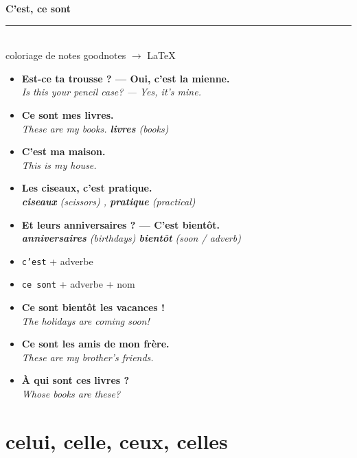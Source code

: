 \documentclass[11pt,a4paper]{article}
\newcommand{\pair}[2]{%
  \item \textbf{#1}\\
  {\color{noteblue}\textit{#2}}%
}
\newcommand{\vocab}[2]{%
  \textbf{#1} {\color{noteblue}\textit{(#2)}}%
}
\begin{document}

\begin{center}
  {\color{plum}\LARGE\bfseries C'est, ce sont}\\[4pt]
  {\color{lavender}\rule{0.55\textwidth}{2.5pt}}\\[6pt]
  {\small coloriage de notes \textbullet{} goodnotes $\rightarrow$ \LaTeX}
\end{center}

\vspace{0.6em}

\begin{exbox}
\begin{itemize}[leftmargin=1.2em,itemsep=0.55em]
  \pair{Est-ce ta trousse ? --- Oui, c'est la mienne.}
       {Is this your pencil case? --- Yes, it's mine.}
  \pair{Ce sont mes livres.}
       {These are my books. \quad \vocab{livres}{books}}
  \pair{C'est ma maison.}
       {This is my house.}
  \pair{Les ciseaux, c'est pratique.}
       {\vocab{ciseaux}{scissors}, \vocab{pratique}{practical}}
  \pair{Et leurs anniversaires ? --- C'est bient\^{o}t.}
       {\vocab{anniversaires}{birthdays} \quad \vocab{bient\^{o}t}{soon / adverb}}
\end{itemize}
\end{exbox}

\begin{rulebox}
\begin{itemize}[leftmargin=1.2em,itemsep=0.4em]
  \item \texttt{c'est} + adverbe
  \item \texttt{ce sont} + adverbe + nom 
\end{itemize}
\end{rulebox}

\begin{exbox}
\begin{itemize}[leftmargin=1.2em,itemsep=0.55em]
  \pair{Ce sont bient\^{o}t les vacances !}
       {The holidays are coming soon!}
  \pair{Ce sont les amis de mon fr\`{e}re.}
       {These are my brother's friends.}
  \pair{\`{A} qui sont ces livres ?}
       {Whose books are these?}
\end{itemize}
\end{exbox}

\newpage

\section*{celui, celle, ceux, celles}
\end{document}
